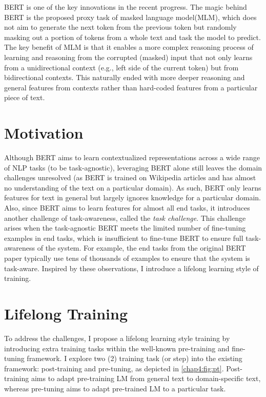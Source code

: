 BERT\cite{devlin2018bert} is one of the key innovations in the recent progress.
The magic behind BERT is the proposed proxy task of masked language model(MLM), which does not aim to generate the next token from the previous token but randomly masking out a portion of tokens from a whole text and task the model to predict.
The key benefit of MLM is that it enables a more complex reasoning process of learning and reasoning from the corrupted (masked) input that not only learns from a unidirectional context (e.g., left side of the current token) but from bidirectional contexts.
This naturally ended with more deeper reasoning and general features from contexts rather than hard-coded features from a particular piece of text.

\section{Motivation}
\label{chap4:sec:motivation}

Although BERT aims to learn contextualized representations across a wide range of NLP tasks (to be task-agnostic), leveraging BERT alone still leaves the domain challenges unresolved (as BERT is trained on Wikipedia articles and has almost no understanding of the text on a particular domain).
As such, BERT only learns features for text in general but largely ignores knowledge for a particular domain.
Also, since BERT aims to learn features for almost all end tasks, it introduces another challenge of task-awareness, called the \textit{task challenge}.
This challenge arises when the task-agnostic BERT meets the limited number of fine-tuning examples in end tasks, which is insufficient to fine-tune BERT to ensure full task-awareness of the system.
For example, the end tasks from the original BERT paper typically use tens of thousands of examples to ensure that the system is task-aware.
Inspired by these observations, I introduce a lifelong learning style of training.

\section{Lifelong Training}

To address the challenges, I propose a lifelong learning style training by introducing extra training tasks within the well-known pre-training and fine-tuning framework.
I explore two (2) training task (or step) into the existing framework: post-training and pre-tuning, as depicted in \ref{chap4:fig:pt}.
Post-training aims to adapt pre-training LM from general text to domain-specific text, whereas pre-tuning aims to adapt pre-trained LM to a particular task.

